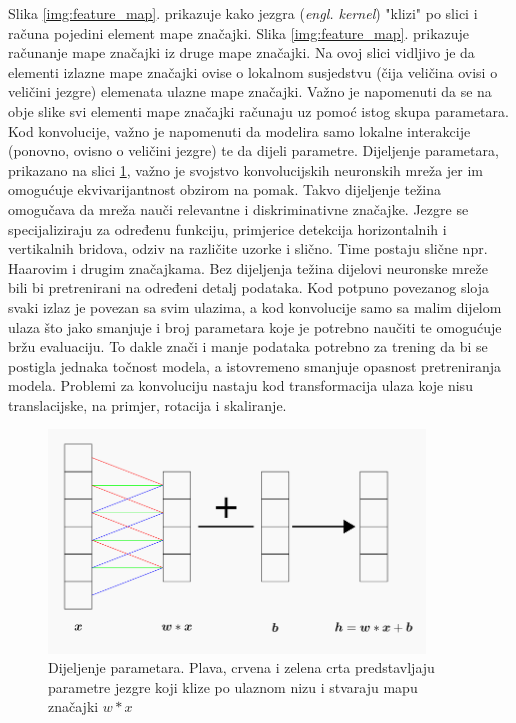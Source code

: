 Slika \ref{img:feature_map}. prikazuje kako jezgra (\textit{engl. kernel}) "klizi" po slici i računa pojedini element mape značajki. Slika \ref{img:feature_map}. prikazuje računanje mape značajki iz druge mape značajki. Na ovoj slici vidljivo je da elementi izlazne mape značajki ovise o lokalnom susjedstvu (čija veličina ovisi o veličini jezgre) elemenata ulazne mape značajki. Važno je napomenuti da se na obje slike svi elementi mape značajki računaju uz pomoć istog skupa parametara. 
Kod konvolucije, važno je napomenuti da modelira samo lokalne interakcije (ponovno, ovisno o veličini jezgre) te da dijeli parametre. Dijeljenje parametara, prikazano na slici \ref{img:param_sharing}, važno je svojstvo konvolucijskih neuronskih mreža jer im omogućuje ekvivarijantnost obzirom na pomak. Takvo dijeljenje težina omogučava da mreža nauči relevantne i diskriminativne značajke. Jezgre se specijaliziraju za određenu funkciju, primjerice detekcija horizontalnih i vertikalnih bridova, odziv na različite uzorke i slično. Time postaju slične npr. Haarovim i drugim značajkama. Bez dijeljenja težina dijelovi neuronske mreže bili bi pretrenirani na određeni detalj podataka. Kod potpuno povezanog sloja svaki izlaz je povezan sa svim ulazima, a kod konvolucije samo sa malim dijelom ulaza što jako smanjuje i broj parametara koje je potrebno naučiti te omogućuje bržu evaluaciju. To dakle znači i manje podataka potrebno za trening da bi se postigla jednaka točnost modela, a istovremeno smanjuje opasnost pretreniranja modela. Problemi za konvoluciju nastaju kod transformacija ulaza koje nisu translacijske, na primjer, rotacija i skaliranje.

\begin{figure}[htb]
\centering
\includegraphics[width=10cm]{img/ParameterSharing.png}
\caption{Dijeljenje parametara. Plava, crvena i zelena crta predstavljaju parametre jezgre koji klize po ulaznom nizu i stvaraju mapu značajki $w * x$ \citep{duPredavanja}}
\label{img:param_sharing}
\end{figure}

